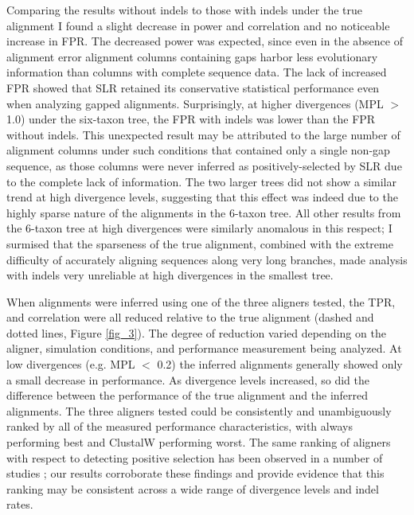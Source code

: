 Comparing the results without indels to those with indels under the
true alignment I found a slight decrease in power and \omg
correlation and no noticeable increase in FPR. The decreased power was
expected, since even in the absence of alignment error alignment
columns containing gaps harbor less evolutionary information than
columns with complete sequence data. The lack of increased FPR showed
that SLR retained its conservative statistical performance even when
analyzing gapped alignments. Surprisingly, at higher divergences (MPL
$>$ 1.0) under the six-taxon tree, the FPR with indels was lower than
the FPR without indels. This unexpected result may be attributed to
the large number of alignment columns under such conditions that
contained only a single non-gap sequence, as those columns were never
inferred as positively-selected by SLR due to the complete lack of
information. The two larger trees did not show a similar trend at high
divergence levels, suggesting that this effect was indeed due to the
highly sparse nature of the alignments in the 6-taxon tree. All other
results from the 6-taxon tree at high divergences were similarly
anomalous in this respect; I surmised that the sparseness of the true
alignment, combined with the extreme difficulty of accurately aligning
sequences along very long branches, made \sw analysis with indels very
unreliable at high divergences in the smallest tree.

When alignments were inferred using one of the three aligners tested,
the TPR, \tpr{} and \omg correlation were all reduced relative to
the true alignment (dashed and dotted lines, Figure \ref{fig_3}). The
degree of reduction varied depending on the aligner, simulation
conditions, and performance measurement being analyzed. At low
divergences (e.g. MPL $<$ 0.2) the inferred alignments generally
showed only a small decrease in performance. As divergence levels
increased, so did the difference between the performance of the true
alignment and the inferred alignments. The three aligners tested could
be consistently and unambiguously ranked by all of the measured
performance characteristics, with \prankc always performing best and
ClustalW performing worst. The same ranking of aligners with respect
to detecting positive selection has been observed in a number of
studies
\citep{Fletcher2010Effect,Markova-Raina2011High,Privman2011Improving};
our results corroborate these findings and provide evidence that this
ranking may be consistent across a wide range of divergence levels and
indel rates.

